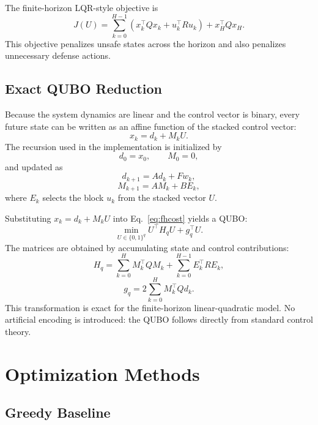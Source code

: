 \documentclass[runningheads]{llncs}
\begin{document}
The finite-horizon LQR-style objective is
\begin{equation}
J(U)=
\sum_{k=0}^{H-1}
\left(x_k^\top Qx_k+u_k^\top Ru_k\right)
+x_H^\top Qx_H.
\label{eq:fhcost}
\end{equation}
This objective penalizes unsafe states across the horizon and also penalizes unnecessary defense actions.

\subsection{Exact QUBO Reduction}

Because the system dynamics are linear and the control vector is binary, every future state can be written as an affine function of the stacked control vector:
\begin{equation}
x_k=d_k+M_kU.
\end{equation}
The recursion used in the implementation is initialized by
\begin{equation}
d_0=x_0,\qquad M_0=0,
\end{equation}
and updated as
\begin{equation}
d_{k+1}=Ad_k+Fw_k,
\end{equation}
\begin{equation}
M_{k+1}=AM_k+BE_k,
\end{equation}
where $E_k$ selects the block $u_k$ from the stacked vector $U$.

Substituting $x_k=d_k+M_kU$ into Eq.~\eqref{eq:fhcost} yields a QUBO:
\begin{equation}
\min_{U\in\{0,1\}^{q}}
U^\top H_q U+g_q^\top U.
\label{eq:qubo}
\end{equation}
The matrices are obtained by accumulating state and control contributions:
\begin{equation}
H_q =
\sum_{k=0}^{H} M_k^\top Q M_k
+
\sum_{k=0}^{H-1}E_k^\top R E_k,
\end{equation}
\begin{equation}
g_q =
2\sum_{k=0}^{H}M_k^\top Qd_k.
\end{equation}
This transformation is exact for the finite-horizon linear-quadratic model. No artificial encoding is introduced: the QUBO follows directly from standard control theory.

\section{Optimization Methods}

\subsection{Greedy Baseline}
\end{document}
